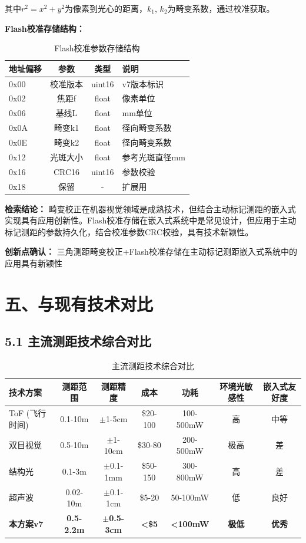 \documentclass[12pt,a4paper]{article}
\begin{document}
其中$r^2 = x^2 + y^2$为像素到光心的距离，$k_1$, $k_2$为畸变系数，通过校准获取。

\textbf{Flash校准存储结构：}

\begin{table}[H]
\centering
\caption{Flash校准参数存储结构}
\begin{tabular}{lccl}
\toprule
地址偏移 & 参数 & 类型 & 说明 \\
\midrule
0x00 & 校准版本 & uint16 & v7版本标识 \\
0x02 & 焦距f & float & 像素单位 \\
0x06 & 基线L & float & mm单位 \\
0x0A & 畸变k1 & float & 径向畸变系数 \\
0x0E & 畸变k2 & float & 径向畸变系数 \\
0x12 & 光斑大小 & float & 参考光斑直径mm \\
0x16 & CRC16 & uint16 & 参数校验 \\
0x18 & 保留 & - & 扩展用 \\
\bottomrule
\end{tabular}
\end{table}

\textbf{检索结论：} 畸变校正在机器视觉领域是成熟技术，但结合主动标记测距的嵌入式实现具有应用创新性。Flash校准存储在嵌入式系统中是常见设计，但应用于主动标记测距的参数持久化，结合校准参数CRC校验，具有技术新颖性。

\textbf{创新点确认：} 三角测距畸变校正+Flash校准存储在主动标记测距嵌入式系统中的应用具有新颖性

\newpage

\section{五、与现有技术对比}

\subsection{5.1 主流测距技术综合对比}

\begin{table}[H]
\centering
\caption{主流测距技术综合对比}
\begin{tabular}{lcccccc}
\toprule
技术方案 & 测距范围 & 测距精度 & 成本 & 功耗 & 环境光敏感性 & 嵌入式友好度 \\
\midrule
ToF (飞行时间) & 0.1-10m & $\pm$1-5cm & \$20-100 & 100-500mW & 高 & 中等 \\
双目视觉 & 0.5-10m & $\pm$1-10cm & \$30-80 & 200-500mW & 极高 & 差 \\
结构光 & 0.1-3m & $\pm$0.1-1mm & \$50-150 & 300-800mW & 高 & 差 \\
超声波 & 0.02-10m & $\pm$0.1-1cm & \$5-20 & 50-100mW & 低 & 良好 \\
\textbf{本方案v7} & \textbf{0.5-2.2m} & \textbf{$\pm$0.5-3cm} & \textbf{<\$5} & \textbf{<100mW} & \textbf{极低} & \textbf{优秀} \\
\bottomrule
\end{tabular}
\end{table}
\end{document}
